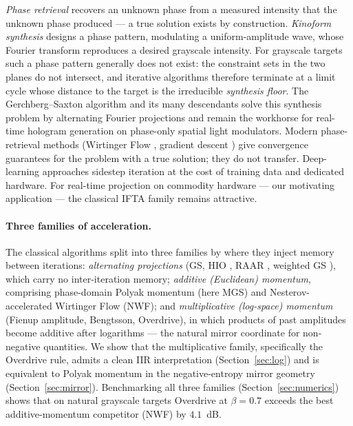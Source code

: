 \documentclass[11pt,a4paper]{article}
\begin{document}
\emph{Phase retrieval} recovers an unknown phase from a measured
intensity that the unknown phase produced --- a true solution exists by
construction. \emph{Kinoform synthesis} \cite{Lesem1969,Soifer1997}
designs a phase pattern, modulating a uniform-amplitude wave, whose
Fourier transform reproduces a desired grayscale intensity. For
grayscale targets such a phase pattern generally does not exist: the
constraint sets in the two planes do not intersect, and iterative
algorithms therefore terminate at a limit cycle whose distance to the
target is the irreducible \emph{synthesis floor}. The Gerchberg--Saxton
algorithm \cite{Gerchberg1972} and its many descendants
\cite{Fienup1978,Fienup1980,Prongue1992,Bengtsson1998,Liu2006} solve this
synthesis problem by alternating Fourier projections and remain the
workhorse for real-time hologram generation on phase-only spatial light
modulators. Modern phase-retrieval methods (Wirtinger Flow
\cite{Candes2014}, gradient descent \cite{Chen2018}) give convergence
guarantees for the problem with a true solution; they do not transfer.
Deep-learning approaches \cite{Zheng2021,Sun2022,Zhu2025} sidestep
iteration at the cost of training data and dedicated hardware. For
real-time projection on commodity hardware --- our motivating
application --- the classical IFTA family remains attractive.

\paragraph{Three families of acceleration.} The classical algorithms split
into three families by where they inject memory between iterations:
\emph{alternating projections} (GS, HIO \cite{Fienup1982}, RAAR
\cite{Luke2005}, weighted GS \cite{DiLeonardo2007}), which carry no
inter-iteration memory; \emph{additive (Euclidean) momentum}, comprising
phase-domain Polyak momentum (here MGS) and Nesterov-accelerated
Wirtinger Flow (NWF); and \emph{multiplicative (log-space) momentum}
(Fienup amplitude, Bengtsson, Overdrive), in which products of past
amplitudes become additive after logarithms --- the natural mirror
coordinate for non-negative quantities. We show that the multiplicative
family, specifically the Overdrive rule, admits a clean IIR
interpretation (Section~\ref{sec:log}) and is equivalent to Polyak
momentum in the negative-entropy mirror geometry
(Section~\ref{sec:mirror}). Benchmarking all three families
(Section~\ref{sec:numerics}) shows that on natural grayscale targets
Overdrive at $\beta=0.7$ exceeds the best additive-momentum competitor
(NWF) by $4.1$~dB.
\end{document}
